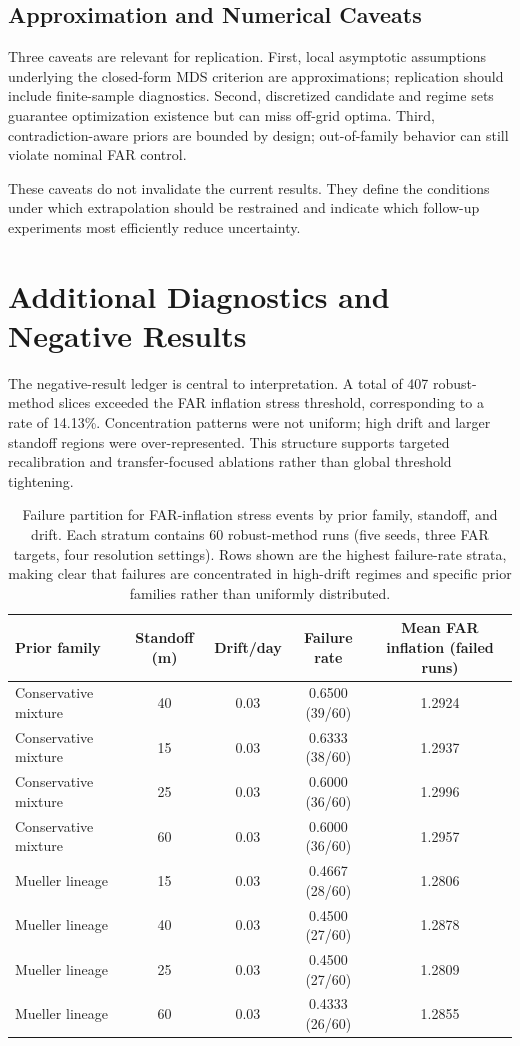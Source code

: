 \documentclass{article} %
\begin{document}
\subsection{Approximation and Numerical Caveats}
Three caveats are relevant for replication. First, local asymptotic assumptions underlying the closed-form MDS criterion are approximations; replication should include finite-sample diagnostics. Second, discretized candidate and regime sets guarantee optimization existence but can miss off-grid optima. Third, contradiction-aware priors are bounded by design; out-of-family behavior can still violate nominal FAR control.

These caveats do not invalidate the current results. They define the conditions under which extrapolation should be restrained and indicate which follow-up experiments most efficiently reduce uncertainty.

\section{Additional Diagnostics and Negative Results}\label{sec:appendix_negative}
The negative-result ledger is central to interpretation. A total of 407 robust-method slices exceeded the FAR inflation stress threshold, corresponding to a rate of 14.13\%. Concentration patterns were not uniform; high drift and larger standoff regions were over-represented. This structure supports targeted recalibration and transfer-focused ablations rather than global threshold tightening.

\begin{table}[h]
\caption{Failure partition for FAR-inflation stress events by prior family, standoff, and drift. Each stratum contains 60 robust-method runs (five seeds, three FAR targets, four resolution settings). Rows shown are the highest failure-rate strata, making clear that failures are concentrated in high-drift regimes and specific prior families rather than uniformly distributed.}
\label{tab:failure_partition}
\centering
\footnotesize
\renewcommand{\arraystretch}{1.1}
\setlength{\tabcolsep}{4pt}
\begin{tabular}{lcccc}
\hline
Prior family & Standoff (m) & Drift/day & Failure rate & Mean FAR inflation (failed runs) \\
\hline
Conservative mixture & 40 & 0.03 & 0.6500 (39/60) & 1.2924 \\
Conservative mixture & 15 & 0.03 & 0.6333 (38/60) & 1.2937 \\
Conservative mixture & 25 & 0.03 & 0.6000 (36/60) & 1.2996 \\
Conservative mixture & 60 & 0.03 & 0.6000 (36/60) & 1.2957 \\
Mueller lineage & 15 & 0.03 & 0.4667 (28/60) & 1.2806 \\
Mueller lineage & 40 & 0.03 & 0.4500 (27/60) & 1.2878 \\
Mueller lineage & 25 & 0.03 & 0.4500 (27/60) & 1.2809 \\
Mueller lineage & 60 & 0.03 & 0.4333 (26/60) & 1.2855 \\
\hline
\end{tabular}
\end{table}
\end{document}
